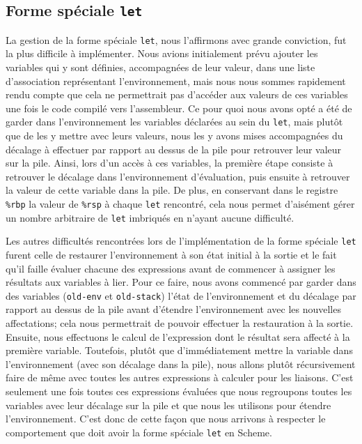 \documentclass[12pt]{article}
\begin{document}
\subsection{Forme spéciale \texttt{let}}
La gestion de la forme spéciale \texttt{let}, nous l'affirmons avec grande conviction, fut la plus difficile à implémenter. Nous avions initialement prévu ajouter les variables qui y sont définies, accompagnées de leur valeur, dans une liste d'association représentant l'environnement, mais nous nous sommes rapidement rendu compte que cela ne permettrait pas d'accéder aux valeurs de ces variables une fois le code compilé vers l'assembleur. Ce pour quoi nous avons opté a été de garder dans l'environnement les variables déclarées au sein du  \texttt{let}, mais plutôt que de les y mettre avec leurs valeurs, nous les y avons mises accompagnées du décalage à effectuer par rapport au dessus de la pile pour retrouver leur valeur sur la pile. Ainsi, lors d'un accès à ces variables, la première étape consiste à retrouver le décalage dans l'environnement d'évaluation, puis ensuite à retrouver la valeur de cette variable dans la pile. De plus, en conservant dans le registre \texttt{\%rbp} la valeur de \texttt{\%rsp} à chaque \texttt{let} rencontré, cela nous permet d'aisément gérer un nombre arbitraire de \texttt{let} imbriqués en n'ayant aucune difficulté.

Les autres difficultés rencontrées lors de l'implémentation de la forme spéciale \texttt{let} furent celle de restaurer l'environnement à son état initial à la sortie et le fait qu'il faille évaluer chacune des expressions avant de commencer à assigner les résultats aux variables à lier. Pour ce faire, nous avons commencé par garder dans des variables (\texttt{old-env} et \texttt{old-stack}) l'état de l'environnement et du décalage par rapport au dessus de la pile avant d'étendre l'environnement avec les nouvelles affectations; cela nous permettrait de pouvoir effectuer la restauration à la sortie. Ensuite, nous effectuons le calcul de l'expression dont le résultat sera affecté à la première variable. Toutefois, plutôt que d'immédiatement mettre la variable dans l'environnement (avec son décalage dans la pile), nous allons plutôt récursivement faire de même avec toutes les autres expressions à calculer pour les liaisons. C'est seulement une fois toutes ces expressions évaluées que nous regroupons toutes les variables avec leur décalage sur la pile et que nous les utilisons pour étendre l'environnement. C'est donc de cette façon que nous arrivons à respecter le comportement que doit avoir la forme spéciale \texttt{let} en Scheme.
\end{document}
